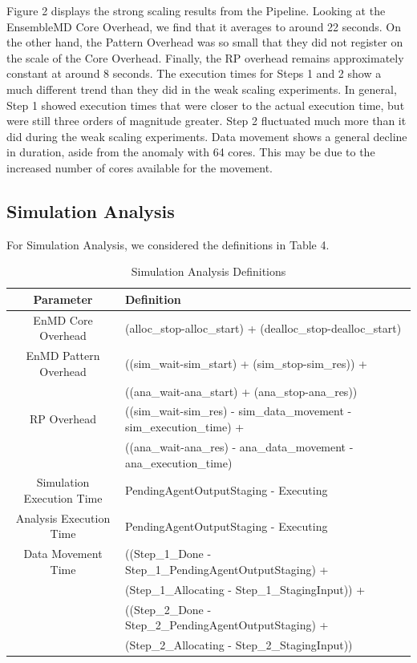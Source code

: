\documentclass[]{article}
\begin{document}
		Figure 2 displays the strong scaling results from the Pipeline. Looking at the EnsembleMD Core Overhead, we find that it averages to around 22 seconds. On the other hand, the Pattern Overhead was so small that they did not register on the scale of the Core Overhead. Finally, the RP overhead remains approximately constant at around 8 seconds. 
		The execution times for Steps 1 and 2 show a much different trend than they did in the weak scaling experiments. In general, Step 1 showed execution times that were closer to the actual execution time, but were still three orders of magnitude greater. Step 2 fluctuated much more than it did during the weak scaling experiments.
		Data movement shows a general decline in duration, aside from the anomaly with 64 cores. This may be due to the increased number of cores available for the movement.

	\subsection{Simulation Analysis}

		For Simulation Analysis, we considered the definitions in Table 4.

		\begin{table}[h!]
			\centering
			\begin{tabular}{|c|p{10cm}|}
				\hline
				Parameter & Definition  \\
				\hline
				EnMD Core Overhead & (alloc\_stop-alloc\_start) +  (dealloc\_stop-dealloc\_start) \\
				\hline
				EnMD Pattern Overhead & ((sim\_wait-sim\_start) + (sim\_stop-sim\_res)) + \\ 
									  &	((ana\_wait-ana\_start) + (ana\_stop-ana\_res)) \\
				\hline
				RP Overhead & ((sim\_wait-sim\_res) - sim\_data\_movement - sim\_execution\_time) + \\
							&	((ana\_wait-ana\_res) - ana\_data\_movement - ana\_execution\_time) \\
				\hline
				Simulation Execution Time & PendingAgentOutputStaging - Executing \\
				\hline
				Analysis Execution Time & PendingAgentOutputStaging - Executing \\
				\hline
				Data Movement Time & ((Step\_1\_Done - Step\_1\_PendingAgentOutputStaging) + \\ 
								   &	(Step\_1\_Allocating - Step\_1\_StagingInput)) + \\
								   &	((Step\_2\_Done - Step\_2\_PendingAgentOutputStaging) + \\
								   &	(Step\_2\_Allocating - Step\_2\_StagingInput)) \\
				\hline
			\end{tabular}
			\caption{Simulation Analysis Definitions}
		\end{table}
\end{document}
